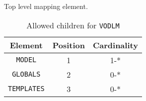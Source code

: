 Top level mapping element.

\begin{table}[!htbp]
\small
\centering
\begin{tabulary}{\linewidth}{|c |c |c|}
    \hline 
        \textbf{Element} &
        \textbf{Position} &
        \textbf{Cardinality}\\
    \hline      \hline  
        \texttt{MODEL} &           
        1 &           
        1-*\\
    \hline    
        \texttt{GLOBALS} &           
        2 &           
        0-*\\
    \hline  
        \texttt{TEMPLATES} &           
        3 &           
        0-*\\
   \hline 
\end{tabulary}
     \caption{Allowed children for \texttt{VODLM}} 
     \label{tbl:vodml-chilren}
 \end{table}
